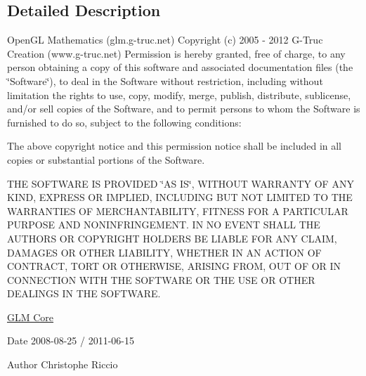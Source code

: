 \subsection{Detailed Description}
Open\-G\-L Mathematics (glm.\-g-\/truc.\-net) Copyright (c) 2005 -\/ 2012 G-\/\-Truc Creation (www.\-g-\/truc.\-net) Permission is hereby granted, free of charge, to any person obtaining a copy of this software and associated documentation files (the \char`\"{}\-Software\char`\"{}), to deal in the Software without restriction, including without limitation the rights to use, copy, modify, merge, publish, distribute, sublicense, and/or sell copies of the Software, and to permit persons to whom the Software is furnished to do so, subject to the following conditions\-:

The above copyright notice and this permission notice shall be included in all copies or substantial portions of the Software.

T\-H\-E S\-O\-F\-T\-W\-A\-R\-E I\-S P\-R\-O\-V\-I\-D\-E\-D \char`\"{}\-A\-S I\-S\char`\"{}, W\-I\-T\-H\-O\-U\-T W\-A\-R\-R\-A\-N\-T\-Y O\-F A\-N\-Y K\-I\-N\-D, E\-X\-P\-R\-E\-S\-S O\-R I\-M\-P\-L\-I\-E\-D, I\-N\-C\-L\-U\-D\-I\-N\-G B\-U\-T N\-O\-T L\-I\-M\-I\-T\-E\-D T\-O T\-H\-E W\-A\-R\-R\-A\-N\-T\-I\-E\-S O\-F M\-E\-R\-C\-H\-A\-N\-T\-A\-B\-I\-L\-I\-T\-Y, F\-I\-T\-N\-E\-S\-S F\-O\-R A P\-A\-R\-T\-I\-C\-U\-L\-A\-R P\-U\-R\-P\-O\-S\-E A\-N\-D N\-O\-N\-I\-N\-F\-R\-I\-N\-G\-E\-M\-E\-N\-T. I\-N N\-O E\-V\-E\-N\-T S\-H\-A\-L\-L T\-H\-E A\-U\-T\-H\-O\-R\-S O\-R C\-O\-P\-Y\-R\-I\-G\-H\-T H\-O\-L\-D\-E\-R\-S B\-E L\-I\-A\-B\-L\-E F\-O\-R A\-N\-Y C\-L\-A\-I\-M, D\-A\-M\-A\-G\-E\-S O\-R O\-T\-H\-E\-R L\-I\-A\-B\-I\-L\-I\-T\-Y, W\-H\-E\-T\-H\-E\-R I\-N A\-N A\-C\-T\-I\-O\-N O\-F C\-O\-N\-T\-R\-A\-C\-T, T\-O\-R\-T O\-R O\-T\-H\-E\-R\-W\-I\-S\-E, A\-R\-I\-S\-I\-N\-G F\-R\-O\-M, O\-U\-T O\-F O\-R I\-N C\-O\-N\-N\-E\-C\-T\-I\-O\-N W\-I\-T\-H T\-H\-E S\-O\-F\-T\-W\-A\-R\-E O\-R T\-H\-E U\-S\-E O\-R O\-T\-H\-E\-R D\-E\-A\-L\-I\-N\-G\-S I\-N T\-H\-E S\-O\-F\-T\-W\-A\-R\-E.

\hyperlink{group__core}{G\-L\-M Core}

\begin{DoxyDate}{Date}
2008-\/08-\/25 / 2011-\/06-\/15 
\end{DoxyDate}
\begin{DoxyAuthor}{Author}
Christophe Riccio 
\end{DoxyAuthor}
